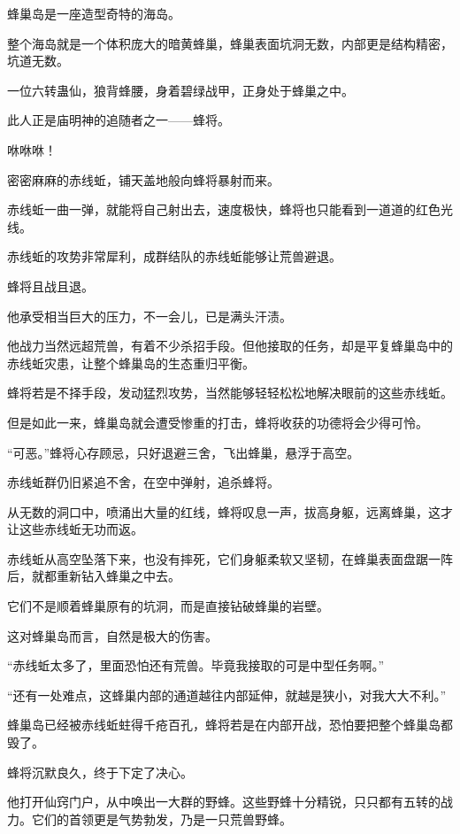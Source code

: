 
\begin{this_body}



蜂巢岛是一座造型奇特的海岛。

整个海岛就是一个体积庞大的暗黄蜂巢，蜂巢表面坑洞无数，内部更是结构精密，坑道无数。

一位六转蛊仙，狼背蜂腰，身着碧绿战甲，正身处于蜂巢之中。

此人正是庙明神的追随者之一——蜂将。

咻咻咻！

密密麻麻的赤线蚯，铺天盖地般向蜂将暴射而来。

赤线蚯一曲一弹，就能将自己射出去，速度极快，蜂将也只能看到一道道的红色光线。

赤线蚯的攻势非常犀利，成群结队的赤线蚯能够让荒兽避退。

蜂将且战且退。

他承受相当巨大的压力，不一会儿，已是满头汗渍。

他战力当然远超荒兽，有着不少杀招手段。但他接取的任务，却是平复蜂巢岛中的赤线蚯灾患，让整个蜂巢岛的生态重归平衡。

蜂将若是不择手段，发动猛烈攻势，当然能够轻轻松松地解决眼前的这些赤线蚯。

但是如此一来，蜂巢岛就会遭受惨重的打击，蜂将收获的功德将会少得可怜。

“可恶。”蜂将心存顾忌，只好退避三舍，飞出蜂巢，悬浮于高空。

赤线蚯群仍旧紧追不舍，在空中弹射，追杀蜂将。

从无数的洞口中，喷涌出大量的红线，蜂将叹息一声，拔高身躯，远离蜂巢，这才让这些赤线蚯无功而返。

赤线蚯从高空坠落下来，也没有摔死，它们身躯柔软又坚韧，在蜂巢表面盘踞一阵后，就都重新钻入蜂巢之中去。

它们不是顺着蜂巢原有的坑洞，而是直接钻破蜂巢的岩壁。

这对蜂巢岛而言，自然是极大的伤害。

“赤线蚯太多了，里面恐怕还有荒兽。毕竟我接取的可是中型任务啊。”

“还有一处难点，这蜂巢内部的通道越往内部延伸，就越是狭小，对我大大不利。”

蜂巢岛已经被赤线蚯蛀得千疮百孔，蜂将若是在内部开战，恐怕要把整个蜂巢岛都毁了。

蜂将沉默良久，终于下定了决心。

他打开仙窍门户，从中唤出一大群的野蜂。这些野蜂十分精锐，只只都有五转的战力。它们的首领更是气势勃发，乃是一只荒兽野蜂。


\end{this_body}
